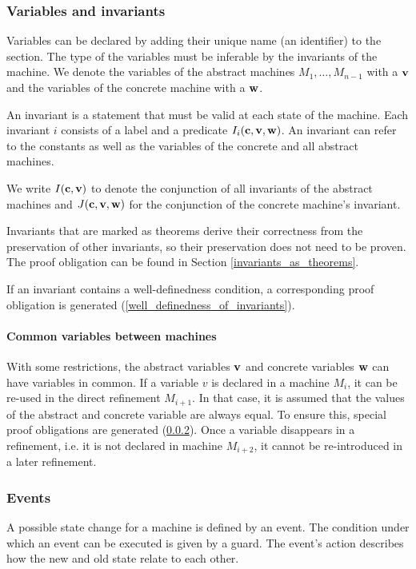 \subsubsection{Variables and invariants}
\label{variables_and_invariants}
Variables can be declared by adding their unique name (an identifier) to the  section. 
The type of the variables must be inferable by the invariants of the machine.
We denote the variables of the abstract machines $M_1,\ldots,M_{n-1}$ with a $\mathbf{v}$ and the variables of the concrete machine with a $\mathbf{w}$.

An invariant is a statement that must be valid at each state of the machine.
Each invariant $i$ consists of a label and a predicate $I_i(\mathbf{c},\mathbf{v},\mathbf{w})$.
An invariant can refer to the constants as well as the variables of the concrete and all abstract machines.

We write $I(\mathbf{c},\mathbf{v})$ to denote the conjunction of all invariants
of the abstract machines and $J(\mathbf{c},\mathbf{v},\mathbf{w})$ for the conjunction of the concrete machine's invariant.

Invariants that are marked as theorems derive their correctness from the preservation
  of other invariants, so their preservation does not need to be proven.
The proof obligation can be found in Section \ref{invariants_as_theorems}.

If an invariant contains a well-definedness condition, 
  a corresponding proof obligation is generated (\ref{well_definedness_of_invariants}).

\paragraph{Common variables between machines}
\label{common_variables}
With some restrictions, the abstract variables $\mathbf{v}$ and concrete
  variables $\mathbf{w}$ can have variables in common.
If a variable $v$ is declared in a machine $M_i$, it can be re-used in the
  direct refinement $M_{i+1}$. 
In that case, it is assumed that the values of the abstract and concrete variable 
  are always equal.
To ensure this, special proof obligations are generated (\ref{events}).
Once a variable disappears in a refinement, i.e. it is not declared in machine $M_{i+2}$,
  it cannot be re-introduced in a later refinement.

\subsubsection{Events}
\label{events}
A possible state change for a machine is defined by an event.
The condition under which an event can be executed is given by a guard. The event's action
describes how the new and old state relate to each other.

